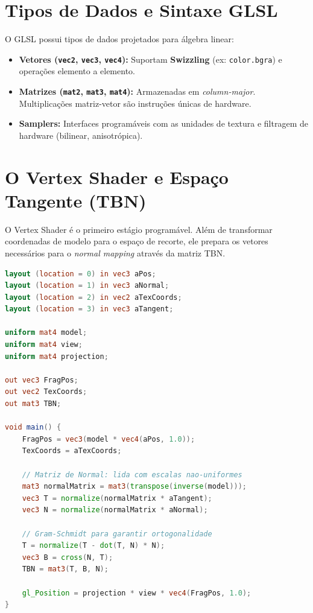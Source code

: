 \section{Tipos de Dados e Sintaxe GLSL}

O GLSL possui tipos de dados projetados para álgebra linear:
\begin{itemize}
    \item \textbf{Vetores (\texttt{vec2}, \texttt{vec3}, \texttt{vec4}):} Suportam \textbf{Swizzling} (ex: \texttt{color.bgra}) e operações elemento a elemento.
    \item \textbf{Matrizes (\texttt{mat2}, \texttt{mat3}, \texttt{mat4}):} Armazenadas em \textit{column-major}. Multiplicações matriz-vetor são instruções únicas de hardware.
    \item \textbf{Samplers:} Interfaces programáveis com as unidades de textura e filtragem de hardware (bilinear, anisotrópica).
\end{itemize}

\section{O Vertex Shader e Espaço Tangente (TBN)}

O Vertex Shader é o primeiro estágio programável. Além de transformar coordenadas de modelo para o espaço de recorte, ele prepara os vetores necessários para o \textit{normal mapping} através da matriz TBN.

\begin{lstlisting}[language=GLSL, caption={Vertex Shader de Transformação e TBN}]
layout (location = 0) in vec3 aPos;
layout (location = 1) in vec3 aNormal;
layout (location = 2) in vec2 aTexCoords;
layout (location = 3) in vec3 aTangent;

uniform mat4 model;
uniform mat4 view;
uniform mat4 projection;

out vec3 FragPos;
out vec2 TexCoords;
out mat3 TBN;

void main() {
    FragPos = vec3(model * vec4(aPos, 1.0));
    TexCoords = aTexCoords;
    
    // Matriz de Normal: lida com escalas nao-uniformes
    mat3 normalMatrix = mat3(transpose(inverse(model)));
    vec3 T = normalize(normalMatrix * aTangent);
    vec3 N = normalize(normalMatrix * aNormal);
    
    // Gram-Schmidt para garantir ortogonalidade
    T = normalize(T - dot(T, N) * N);
    vec3 B = cross(N, T);
    TBN = mat3(T, B, N);
    
    gl_Position = projection * view * vec4(FragPos, 1.0);
}
\end{lstlisting}

